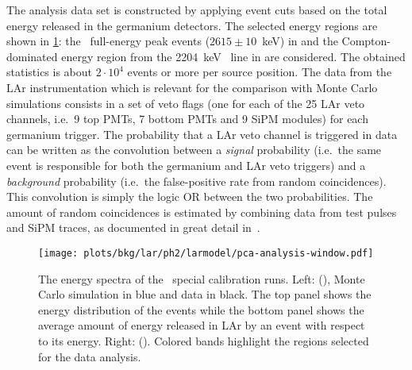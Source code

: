 The analysis data set is constructed by applying event cuts based on the total energy
released in the germanium detectors. The selected energy regions are shown in
\cref{fig:bkg:lar:ph2:pcalib-data}: the \Tl\ full-energy peak events ($2615 \pm 10$~keV)
in  and the Compton-dominated energy region from the 2204~keV \Bih\ line in
 are considered. The obtained statistics is about $2 \cdot 10^4$ events or more
per source position.  The data from the LAr instrumentation which is relevant for the
comparison with Monte Carlo simulations consists in a set of veto flags (one for each of
the 25 LAr veto channels, i.e.~9 top PMTs, 7 bottom PMTs and 9 SiPM modules) for each
germanium trigger.  The probability that a LAr veto channel is triggered in data can be
written as the convolution between a \emph{signal} probability (i.e.~the same event is
responsible for both the germanium and LAr veto triggers) and a \emph{background}
probability (i.e.~the false-positive rate from random coincidences). This convolution is
simply the logic OR between the two probabilities. The amount of random coincidences is
estimated by combining data from test pulses and SiPM traces, as documented in great
detail in~\cite{Wiesinger2021}.

\begin{figure}
  \centering
  \texttt{[image: plots/bkg/lar/ph2/larmodel/pca-analysis-window.pdf]}
  \caption{%
    The energy spectra of the \phasetwo\ special calibration runs. Left:  (\Th),
    Monte Carlo simulation in blue and data in black. The top panel shows the energy
    distribution of the events while the bottom panel shows the average amount of
    energy released in LAr by an event with respect to its energy. Right:  (\Ra).
    Colored bands highlight the regions selected for the data analysis.
  }\label{fig:bkg:lar:ph2:pcalib-data}
\end{figure}

